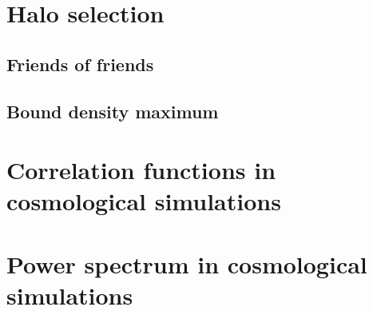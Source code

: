 \section{ Halo selection }
\subsection{ Friends of friends }
\subsection{ Bound density maximum }



\section{ Correlation functions in cosmological simulations }



\section{ Power spectrum in cosmological simulations }

